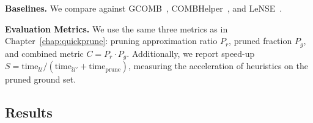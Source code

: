 \textbf{Baselines.} We compare against GCOMB~\citep{manchanda2020gcomb},
COMBHelper~\citep{tian2024combhelper}, and LeNSE~\citep{ireland2022lense}.

\textbf{Evaluation Metrics.} We use the same three metrics as in Chapter~\ref{chap:quickprune}: pruning
approximation ratio $P_r$, pruned fraction $P_g$, and combined metric $C = P_r \cdot P_g$.
Additionally, we report speed-up
$S = \text{time}_{\mathcal{U}} / (\text{time}_{\mathcal{U}'} + \text{time}_{\text{prune}})$,
measuring the acceleration of heuristics on the pruned ground set.

\subsection{Results}

